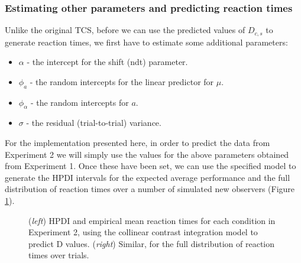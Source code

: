 \documentclass[preprint,12pt,authoryear]{elsarticle}
\begin{document}
\subsubsection{Estimating other parameters and predicting reaction times}

Unlike the original TCS, before we can use the predicted values of $D_{c,s}$ to generate reaction times, we first have to estimate some additional parameters: 

\begin{itemize}	
\item $\alpha$ - the intercept for the shift (ndt) parameter.
\item $\phi_a$ - the random intercepts for the linear predictor for $\mu$.
\item $\phi_\alpha$ - the random intercepts for $a$.
\item $\sigma$ - the residual (trial-to-trial) variance. 
\end{itemize}

For the implementation presented here, in order to predict the data from Experiment 2 we will simply use the values for the above parameters obtained from Experiment 1. Once these have been set, we can use the specified model to generate the HPDI intervals for the expected average performance and the full distribution of reaction times over a number of simulated new observers (Figure \ref{fig:buetti2019_rt}).

\begin{figure}
\centering
{}
\caption{(\textit{left}) HPDI and empirical mean reaction times for each condition in Experiment 2, using the collinear contrast integration model to predict D values. (\textit{right}) Similar, for the full distribution of reaction times over trials. }
\label{fig:buetti2019_rt}
\end{figure}
\end{document}
